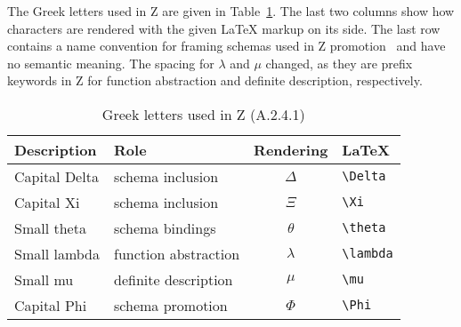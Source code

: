 \documentclass{article}
\newcommand{\smallcaption}[1]{{\small (#1)}}
\begin{document}
The Greek letters used in Z are given in Table~\ref{tbl:letters-greek}.
The last two columns show how characters are rendered with the given
\LaTeX{} markup on its side. The last row contains a name convention for
framing schemas used in Z promotion~\cite[Ch.~13]{usingz} and have no semantic meaning.
The spacing for $\lambda$ and $\mu$ changed, as they are prefix keywords in Z
for function abstraction and definite description, respectively.
%
\begin{table}[ht]
\centering
\begin{tabular}{|l|l|c|l|}
   \hline
   \textbf{Description} & \textbf{Role} & \textbf{Rendering} & \textbf{\LaTeX} \\
   \hline
   Capital Delta & schema inclusion         & $\Delta$  & \verb|\Delta| \\
   \hline
   Capital Xi    & schema inclusion         & $\Xi$     & \verb|\Xi| \\
   \hline
   Small theta   & schema bindings          & $\theta$  & \verb|\theta| \\
   \hline
   Small lambda  & function abstraction     & $\lambda$ & \verb|\lambda| \\
   \hline
   Small mu      & definite description     & $\mu$ & \verb|\mu| \\
   \hline
   Capital Phi   & schema promotion         & $\Phi$    & \verb|\Phi| \\
   \hline
\end{tabular}
\caption{Greek letters used in Z \smallcaption{A.2.4.1}}\label{tbl:letters-greek}
\end{table}
\end{document}
